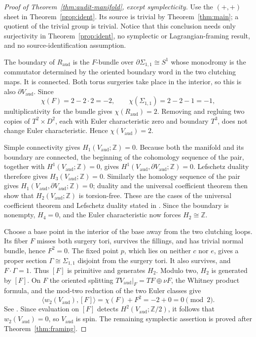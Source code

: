 \documentclass[11pt]{article}
\newcommand{\Z}{\mathbb{Z}}
\theoremstyle{definition}
\begin{document}
\begin{proof}[Proof of Theorem~\ref{thm:audit-manifold}, except symplecticity]
Use the $(+,+)$ sheet in Theorem~\ref{prop:ident}.  Its source is trivial
by Theorem~\ref{thm:main}; a quotient of the trivial
group is trivial.  Notice that this conclusion needs only surjectivity in
Theorem~\ref{prop:ident}, no symplectic or Lagrangian-framing result, and
no source-identification assumption.

The boundary of $R_{\mathrm{aud}}$ is the $F$-bundle over
$\partial\Sigma_{1,1}\cong S^1$ whose monodromy is the commutator determined
by the oriented boundary word in the two clutching maps.  It is connected.
Both torus surgeries take place in the interior, so this is also
$\partial V_{\mathrm{aud}}$.  Since
\[
 \chi(F)=2-2\cdot2=-2,\qquad
 \chi(\Sigma_{1,1})=2-2-1=-1,
\]
multiplicativity for the bundle gives
$\chi(R_{\mathrm{aud}})=2$.  Removing and regluing two copies of
$T^2\times D^2$, each with Euler characteristic zero and boundary $T^3$,
does not change Euler characteristic.  Hence
$\chi(V_{\mathrm{aud}})=2$.

Simple connectivity gives $H_1(V_{\mathrm{aud}};\Z)=0$.  Because both the
manifold and its boundary are connected, the beginning of the cohomology
sequence of the pair, together with $H^1(V_{\mathrm{aud}};\Z)=0$, gives
$H^1(V_{\mathrm{aud}},\partial V_{\mathrm{aud}};\Z)=0$.
Lefschetz duality therefore gives $H_3(V_{\mathrm{aud}};\Z)=0$.
Similarly the homology sequence of the pair gives
$H_1(V_{\mathrm{aud}},\partial V_{\mathrm{aud}};\Z)=0$; duality and the
universal coefficient theorem then show that $H_2(V_{\mathrm{aud}};\Z)$ is
torsion-free.  These are the cases of the universal coefficient theorem and
Lefschetz duality stated in \cite[Theorems~3.2 and~3.43]{HatcherAT}.
Since the boundary is nonempty, $H_4=0$, and the Euler characteristic now
forces $H_2\cong\Z$.

Choose a base point in the interior of the base away from the two clutching
loops.  Its fiber $F$ misses both surgery tori, survives the fillings, and
has trivial normal bundle, hence $F^2=0$.  The fixed point $p$, which lies
on neither $c$ nor $e$, gives a proper section
$\Gamma\cong\Sigma_{1,1}$ disjoint from the surgery tori.  It also survives,
and $F\cdot\Gamma=1$.  Thus $[F]$ is primitive and generates $H_2$.
Modulo two, $H_2$ is generated by $[F]$.  On $F$ the oriented splitting
$TV_{\mathrm{aud}}|_F=TF\oplus\nu F$, the Whitney product formula, and
the mod-two reduction of the two Euler classes give
\[
 \langle w_2(V_{\mathrm{aud}}),[F]\rangle
   =\chi(F)+F^2=-2+0=0\pmod2.
\]
See \cite[\S\S4 and~9]{MilnorStasheff}.  Since evaluation on $[F]$
detects $H^2(V_{\mathrm{aud}};\Z/2)$, it follows that
$w_2(V_{\mathrm{aud}})=0$, so $V_{\mathrm{aud}}$ is spin.  The remaining
symplectic assertion is proved after Theorem~\ref{thm:framing}.
\end{proof}
\end{document}
